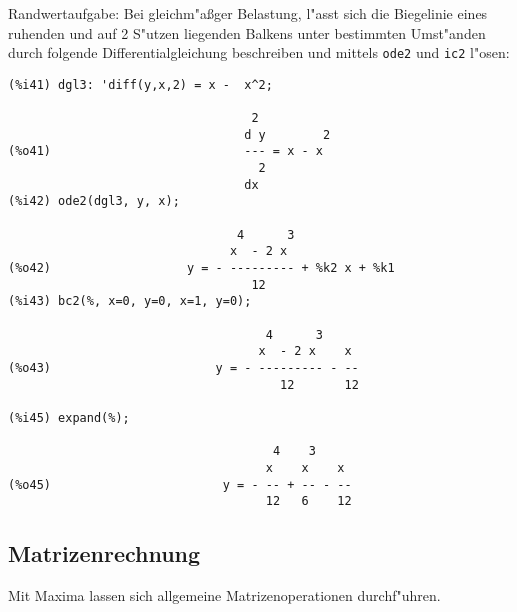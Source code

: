 \documentclass[spanish,12pt,a4paper]{article}
\begin{document}
Randwertaufgabe: Bei gleichm"a{\ss}ger Belastung, l"asst sich die Biegelinie eines ruhenden und auf 2 S"utzen liegenden Balkens unter bestimmten Umst"anden durch folgende Differentialgleichung beschreiben und mittels \verb|ode2| und \verb|ic2| l"osen:

\scriptsize
\begin{verbatim}
(%i41) dgl3: 'diff(y,x,2) = x -  x^2;

                                  2
                                 d y        2
(%o41)                           --- = x - x
                                   2
                                 dx
(%i42) ode2(dgl3, y, x);

                                4      3
                               x  - 2 x
(%o42)                   y = - --------- + %k2 x + %k1
                                  12
(%i43) bc2(%, x=0, y=0, x=1, y=0);

                                    4      3
                                   x  - 2 x    x
(%o43)                       y = - --------- - --
                                      12       12

(%i45) expand(%);

                                     4    3
                                    x    x    x
(%o45)                        y = - -- + -- - --
                                    12   6    12
\end{verbatim}
\normalsize

\subsection{Matrizenrechnung}

Mit Maxima lassen sich allgemeine Matrizenoperationen durchf"uhren.
\end{document}
